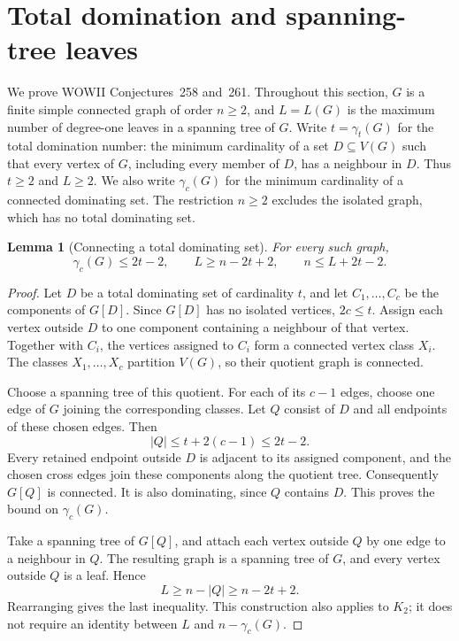 \documentclass[11pt,a4paper]{article}
\newtheorem{lemma}[theorem]{Lemma}
\theoremstyle{remark}
\begin{document}
\section{Total domination and spanning-tree leaves}
\label{sec:totaldom}

We prove WOWII Conjectures~258 and~261. Throughout this section, $G$ is a
finite simple connected graph of order $n\geq 2$, and $L=L(G)$ is the
maximum number of degree-one leaves in a spanning tree of $G$. Write
$t=\gamma_t(G)$ for the total domination number: the minimum cardinality
of a set $D\subseteq V(G)$ such that every vertex of $G$, including every
member of $D$, has a neighbour in $D$. Thus $t\geq 2$ and $L\geq 2$.
We also write $\gamma_c(G)$ for the minimum cardinality of a connected
dominating set. The restriction $n\geq 2$ excludes the isolated graph,
which has no total dominating set.

\begin{lemma}[Connecting a total dominating set]
\label{lem:newtd-connector}
For every such graph,
\begin{equation}
\label{eq:newtd-connector}
 \gamma_c(G)\leq 2t-2,
 \qquad L\geq n-2t+2,
 \qquad n\leq L+2t-2.
\end{equation}
\end{lemma}

\begin{proof}
Let $D$ be a total dominating set of cardinality $t$, and let
$C_1,\ldots,C_c$ be the components of $G[D]$. Since $G[D]$ has no isolated
vertices, $2c\leq t$. Assign each vertex outside $D$ to one component
containing a neighbour of that vertex. Together with $C_i$, the vertices
assigned to $C_i$ form a connected vertex class $X_i$. The classes
$X_1,\ldots,X_c$ partition $V(G)$, so their quotient graph is connected.

Choose a spanning tree of this quotient. For each of its $c-1$ edges,
choose one edge of $G$ joining the corresponding classes. Let $Q$ consist
of $D$ and all endpoints of these chosen edges. Then
\[
 |Q|\leq t+2(c-1)\leq 2t-2.
\]
Every retained endpoint outside $D$ is adjacent to its assigned
component, and the chosen cross edges join these components along the
quotient tree. Consequently $G[Q]$ is connected. It is also dominating,
since $Q$ contains $D$. This proves the bound on $\gamma_c(G)$.

Take a spanning tree of $G[Q]$, and attach each vertex outside $Q$ by one
edge to a neighbour in $Q$. The resulting graph is a spanning tree of $G$,
and every vertex outside $Q$ is a leaf. Hence
\[
 L\geq n-|Q|\geq n-2t+2.
\]
Rearranging gives the last inequality. This construction also applies
to $K_2$; it does not require an identity between $L$ and $n-\gamma_c(G)$.
\end{proof}
\end{document}
